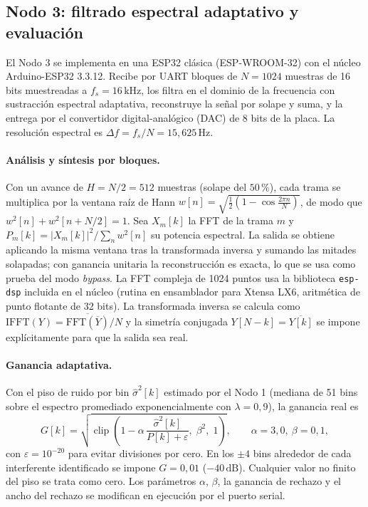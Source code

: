 \subsection{Nodo 3: filtrado espectral adaptativo y evaluaci\'on}

El Nodo 3 se implementa en una ESP32 cl\'asica (ESP-WROOM-32) con el n\'ucleo Arduino-ESP32 3.3.12. Recibe por UART
bloques de $N=1024$ muestras de 16 bits muestreadas a $f_s=16\,\mathrm{kHz}$, los filtra en el dominio de la frecuencia con
sustracci\'on espectral adaptativa, reconstruye la se\~nal por solape y suma, y la entrega por el convertidor
digital-anal\'ogico (DAC) de 8 bits de la placa. La resoluci\'on espectral es $\Delta f=f_s/N=15{,}625\,\mathrm{Hz}$.

\paragraph{An\'alisis y s\'intesis por bloques.}
Con un avance de $H=N/2=512$ muestras (solape del $50\,\%$), cada trama se multiplica por la ventana ra\'iz de Hann
$w[n]=\sqrt{\tfrac12\left(1-\cos\tfrac{2\pi n}{N}\right)}$, de modo que $w^2[n]+w^2[n+N/2]=1$. Sea $X_m[k]$ la FFT de la
trama $m$ y $P_m[k]=|X_m[k]|^2/\sum_n w^2[n]$ su potencia espectral. La salida se obtiene aplicando la misma ventana tras la
transformada inversa y sumando las mitades solapadas; con ganancia unitaria la reconstrucci\'on es exacta, lo que se usa como
prueba del modo \emph{bypass}. La FFT compleja de 1024 puntos usa la biblioteca \texttt{esp-dsp} incluida en el n\'ucleo
(rutina en ensamblador para Xtensa LX6, aritm\'etica de punto flotante de 32 bits). La transformada inversa se calcula como
$\mathrm{IFFT}(Y)=\overline{\mathrm{FFT}(\overline{Y})}/N$ y la simetr\'ia conjugada $Y[N-k]=\overline{Y[k]}$ se impone
expl\'icitamente para que la salida sea real.

\paragraph{Ganancia adaptativa.}
Con el piso de ruido por bin $\hat{\sigma}^2[k]$ estimado por el Nodo 1 (mediana de 51 bins sobre el espectro promediado
exponencialmente con $\lambda=0{,}9$), la ganancia real es
\begin{equation}
  G[k]=\sqrt{\operatorname{clip}\!\left(1-\alpha\,\frac{\hat{\sigma}^2[k]}{P[k]+\varepsilon},\;\beta^2,\;1\right)},
  \qquad \alpha=3{,}0,\ \beta=0{,}1,
\end{equation}
con $\varepsilon=10^{-20}$ para evitar divisiones por cero. En los $\pm4$ bins alrededor de cada interferente identificado
se impone $G=0{,}01$ ($-40\,\mathrm{dB}$). Cualquier valor no finito del piso se trata como cero. Los par\'ametros
$\alpha$, $\beta$, la ganancia de rechazo y el ancho del rechazo se modifican en ejecuci\'on por el puerto serial.

